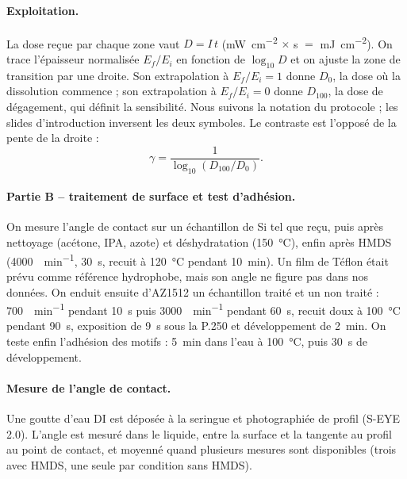 \paragraph{Exploitation.}
La dose reçue par chaque zone vaut $D = I\,t$ (\unit{\milli\watt\per\centi\metre\squared} $\times$ \unit{\second} $=$ \unit{\milli\joule\per\centi\metre\squared}). On trace l'épaisseur normalisée $E_f/E_i$ en fonction de $\log_{10} D$ et on ajuste la zone de transition par une droite. Son extrapolation à $E_f/E_i = 1$ donne $D_0$, la dose où la dissolution commence ; son extrapolation à $E_f/E_i = 0$ donne $D_{100}$, la dose de dégagement, qui définit la sensibilité. Nous suivons la notation du protocole \cite{prot1} ; les slides d'introduction \cite{intro} inversent les deux symboles. Le contraste est l'opposé de la pente de la droite :
\begin{equation}
  \gamma = \frac{1}{\log_{10}\left(D_{100} / D_0\right)} .
  \label{eq:contraste}
\end{equation}

\paragraph{Partie B -- traitement de surface et test d'adhésion.}
On mesure l'angle de contact sur un échantillon de Si tel que reçu, puis après nettoyage (acétone, IPA, azote) et déshydratation (\qty{150}{\celsius}), enfin après HMDS (\qty{4000}{\tour\per\minute}, \qty{30}{\second}, recuit à \qty{120}{\celsius} pendant \qty{10}{\minute}). Un film de Téflon était prévu comme référence hydrophobe, mais son angle ne figure pas dans nos données. On enduit ensuite d'AZ1512 un échantillon traité et un non traité : \qty{700}{\tour\per\minute} pendant \qty{10}{\second} puis \qty{3000}{\tour\per\minute} pendant \qty{60}{\second}, recuit doux à \qty{100}{\celsius} pendant \qty{90}{\second}, exposition de \qty{9}{\second} sous la P.250 et développement de \qty{2}{\minute}. On teste enfin l'adhésion des motifs : \qty{5}{\minute} dans l'eau à \qty{100}{\celsius}, puis \qty{30}{\second} de développement.

\paragraph{Mesure de l'angle de contact.}
Une goutte d'eau DI est déposée à la seringue et photographiée de profil (S-EYE 2.0). L'angle est mesuré dans le liquide, entre la surface et la tangente au profil au point de contact, et moyenné quand plusieurs mesures sont disponibles (trois avec HMDS, une seule par condition sans HMDS).

